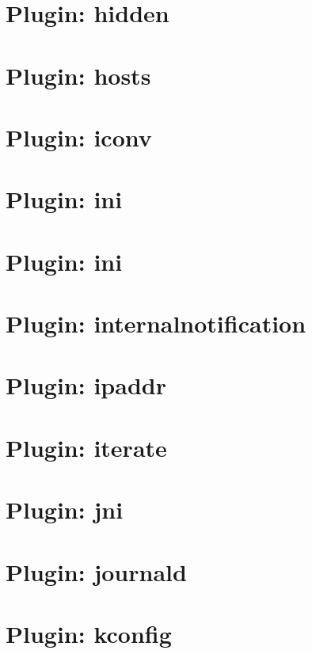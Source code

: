 \documentclass[twoside]{book}
\newcommand{\+}{\discretionary{\mbox{\scriptsize$\hookleftarrow$}}{}{}}
\begin{document}
\chapter{Plugin\+: hidden}
\label{autotoc_md263}

\chapter{Plugin\+: hosts}
\label{autotoc_md264}

\chapter{Plugin\+: iconv}
\label{autotoc_md282}

\chapter{Plugin\+: ini}
\label{autotoc_md288}

\chapter{Plugin\+: ini}
\label{autotoc_md289}

\chapter{Plugin\+: internalnotification}
\label{autotoc_md318}

\chapter{Plugin\+: ipaddr}
\label{autotoc_md320}

\chapter{Plugin\+: iterate}
\label{autotoc_md337}

\chapter{Plugin\+: jni}
\label{autotoc_md338}

\chapter{Plugin\+: journald}
\label{autotoc_md348}

\chapter{Plugin\+: kconfig}
\label{autotoc_md350}

\end{document}
